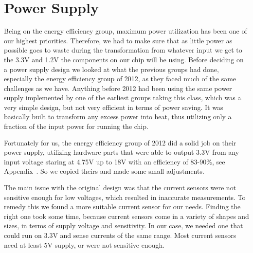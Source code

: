 \section{Power Supply}

Being on the energy efficiency group, maximum power utilization has been one of our highest priorities. Therefore, we had to make sure that as little power as possible goes to waste during the transformation from whatever input we get to the 3.3V and 1.2V the components on our chip will be using. Before deciding on a power supply design we looked at what the previous groups had done, especially the energy efficiency group of 2012, as they faced much of the same challenges as we have. Anything before 2012 had been using the same power supply implemented by one of the earliest groups taking this class, which was a very simple design, but not very efficient in terms of power saving. It was basically built to transform any excess power into heat, thus utilizing only a fraction of the input power for running the chip.

Fortunately for us, the energy efficiency group of 2012 did a solid job on their power supply, utilizing hardware parts that were able to output 3.3V from any input voltage staring at 4.75V up to 18V with an efficiency of 83-90\%, see Appendix~. So we copied theirs and made some small adjustments.

The main issue with the original design was that the current sensors were not sensitive enough for low voltages, which resulted in inaccurate measurements. To remedy this we found a more suitable current sensor for our needs. Finding the right one took some time, because current sensors come in a variety of shapes and sizes, in terms of supply voltage and sensitivity. In our case, we needed one that could run on 3.3V and sense currents of the same range. Most current sensors need at least 5V supply, or were not sensitive enough. 



  



	
